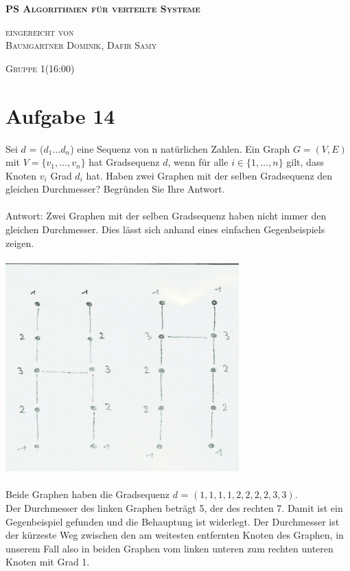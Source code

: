 \documentclass[12pt,a4paper]{report}
\begin{document}
\begin{titlepage}
	\begin{center}

		\vspace*{1.0cm}
		\huge
		\textsc{\bf{PS Algorithmen für verteilte Systeme}}

		\vspace*{4.0cm}
		\textsc{
			\normalsize{eingereicht von} \\[0.5\baselineskip]
			{\large Baumgartner Dominik, Dafir Samy}
		}

		\vspace*{3.0cm}
		\textsc{
			\normalsize{Gruppe  1(16:00)}
		}

	\end{center}
\end{titlepage}

\section*{Aufgabe 14}
Sei $d$ = ($d_1\dots d_n$) eine Sequenz von n natürlichen Zahlen. Ein Graph $G = (V, E)$ mit $V = \{v_1,\dots, v_n\}$ hat Gradsequenz $d$, wenn für alle $i \in \{1,\dots, n\}$ gilt, dass Knoten $v_i$ Grad $d_i$ hat. Haben zwei Graphen mit der selben Gradsequenz den gleichen Durchmesser? Begründen Sie Ihre Antwort.
\\
\\
Antwort: Zwei Graphen mit der selben Gradsequenz haben nicht immer den gleichen Durchmesser. Dies lässt sich anhand eines einfachen Gegenbeispiels zeigen.\\
\\
\includegraphics[height=8cm]{gegenbsp.png}
\\
\\
Beide Graphen haben die Gradsequenz $d$ = $(1,1,1,1,2,2,2,2,3,3)$.\\
Der Durchmesser des linken Graphen beträgt 5, der des rechten 7. Damit ist ein Gegenbeispiel gefunden und die Behauptung ist widerlegt.
Der Durchmesser ist der kürzeste Weg zwischen den am weitesten entfernten Knoten des Graphen, in unserem Fall also in beiden Graphen vom linken unteren zum rechten unteren Knoten mit Grad 1.
\end{document}
